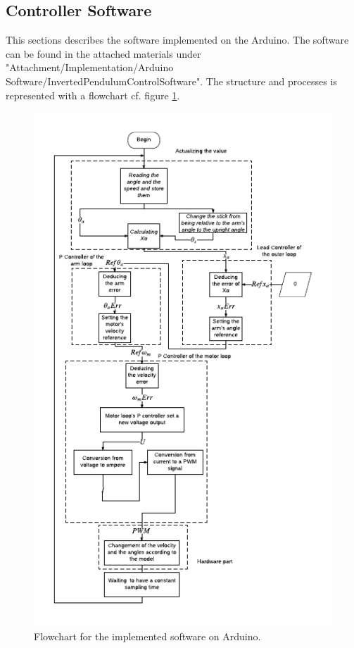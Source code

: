\subsection{Controller Software}
This sections describes the software implemented on the Arduino.  The software can be found in the attached materials under "Attachment/Implementation/Arduino Software/InvertedPendulumControlSoftware". The structure and processes is represented with a flowchart cf. figure \ref{fig:Flowchart}.   
\begin{figure}[htbp]
\centering
\includegraphics[width=1\linewidth]{figures/Flowchart.pdf}
\caption{Flowchart for the implemented software on Arduino.}
\label{fig:Flowchart}
\end{figure}

